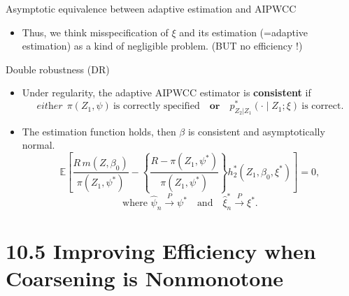 \documentclass[xcolor=dvipsnames,aspectratio=169]{beamer}
\newcommand{\E}{\mathbb{E}}
\newcommand{\1}{\mathbbm{1}}
\begin{document}
\begin{frame}{Asymptotic equivalence between adaptive estimation and AIPWCC}
  \begin{itemize}
    \begin{tcolorbox}[colframe=Cyan,title=Theorem 10.3]
    Let $\widehat{\beta}_n$ be the estimator obtained by the adaptive estimation, and let $\widehat{\beta}_n^{\ast}$ be the AIPWCC estimator
    . Under suitable regularity conditions,
    \[
      n^{1/2}\!\left(\widehat{\beta}_n-\widehat{\beta}_n^{\ast}\right)\xrightarrow{P}0.
    \]
    Hence, the adaptive estimator is asymptotically equivalent to the
    AIPWCC estimator.
  \end{tcolorbox}
  \item Thus, we think misspecification of $\xi$ and its estimation (=adaptive estimation) as a kind of negligible problem. (BUT no efficiency !)
  \end{itemize}
\end{frame}

\begin{frame}{Double robustness (DR)}
  \begin{itemize}
    \item Under regularity, the adaptive AIPWCC estimator is \textbf{consistent} if
    \[
      \textit{either}\ \ \pi(Z_1,\psi)\ \text{is correctly specified} \quad \textbf{or}\quad p^\ast_{Z_2|Z_1}(\cdot\mid Z_1;\xi)\ \text{is correct}.
    \]
    \item The estimation function holds, then $\beta$ is consistent and asymptotically normal.
    \[
\E\!\left[
  \frac{R\,m(Z,\beta_{0})}{\pi(Z_{1},\psi^{\ast})}
  - \left\{
      \frac{R-\pi(Z_{1},\psi^{\ast})}{\pi(Z_{1},\psi^{\ast})}
    \right\}
    h^{\ast}_{2}(Z_{1},\beta_{0},\xi^{\ast})
\right] = 0,
\]
\[
\text{where } \hat{\psi}_{n}\xrightarrow{P}\psi^{\ast}
\quad \text{and} \quad \hat{\xi}^{\ast}_{n}\xrightarrow{P}\xi^{\ast}.
\]

  \end{itemize}
\end{frame}

\section{10.5 Improving Efficiency when Coarsening is Nonmonotone}
\end{document}
